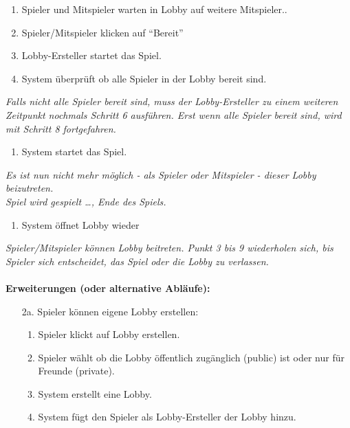 \documentclass[11pt,ngerman]{article}
\newcommand{\quotes}[1]{``#1''}
\begin{document}
\begin{tcolorbox}
\begin{enumerate}
                    \item Spieler und Mitspieler warten in Lobby auf weitere Mitspieler..
                    \item Spieler/Mitspieler klicken auf \quotes{Bereit}
                    \item Lobby-Ersteller startet das Spiel.
                    \item System überprüft ob alle Spieler in der Lobby bereit sind.
                \end{enumerate}
                \textit{Falls nicht alle Spieler bereit sind, muss der Lobby-Ersteller zu einem weiteren Zeitpunkt nochmals Schritt 6 ausführen. Erst wenn alle Spieler bereit sind, wird mit Schritt 8 fortgefahren.}
                \begin{enumerate}[resume]
                    \item System startet das Spiel.
                \end{enumerate}
                \textit{Es ist nun nicht mehr möglich - als Spieler oder Mitspieler - dieser Lobby beizutreten.} \\
                \textit{Spiel wird gespielt …, Ende des Spiels.}
                \begin{enumerate}[resume]
                    \item System öffnet Lobby wieder
                \end{enumerate}
                \textit{Spieler/Mitspieler können Lobby beitreten. Punkt 3 bis 9 wiederholen sich, bis Spieler sich entscheidet, das Spiel oder die Lobby zu verlassen.} \\
                \\ \textbf{Erweiterungen (oder alternative Abläufe):}
                \begin{itemize}
                    \item[2a.] Spieler können eigene Lobby erstellen:
                        \begin{enumerate}
                            \item Spieler klickt auf Lobby erstellen.
                            \item Spieler wählt ob die Lobby öffentlich zugänglich (public) ist oder nur für Freunde (private).
                            \item System erstellt eine Lobby.
                            \item System fügt den Spieler als Lobby-Ersteller der Lobby hinzu.
                        \end{enumerate}

\end{itemize}
\end{tcolorbox}
\end{document}
